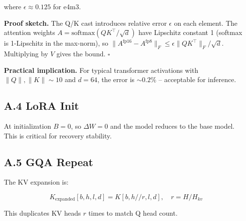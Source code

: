where $\epsilon \approx 0.125$ for e4m3.

\textbf{Proof sketch.} The Q/K cast introduces relative error $\epsilon$ on each 
element. The attention weights $A = \text{softmax}(QK^\top/\sqrt{d})$ have 
Lipschitz constant 1 (softmax is 1-Lipschitz in the max-norm), so 
$\|A^\text{fp16} - A^\text{fp8}\|_F \leq \epsilon \|QK^\top\|_F / \sqrt{d}$. 
Multiplying by $V$ gives the bound. $\square$

\textbf{Practical implication.} For typical transformer activations with 
$\|Q\|, \|K\| \sim 10$ and $d = 64$, the error is $\sim 0.2\%$ -- acceptable 
for inference.

\subsection{A.4 LoRA Init}

At initialization $B = 0$, so $\Delta W = 0$ and the model reduces to the 
base model. This is critical for recovery stability.

\subsection{A.5 GQA Repeat}

The KV expansion is:

\[
K_\text{expanded}[b, h, l, d] = K[b, h // r, l, d], \quad r = H / H_{kv}
\tag{A.5}
\]

This duplicates KV heads $r$ times to match Q head count.

